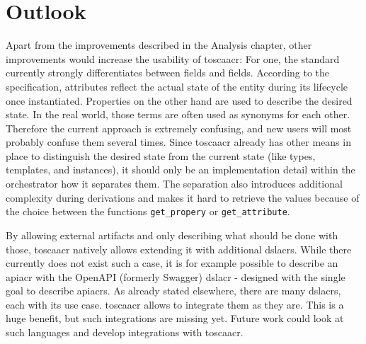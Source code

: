 \chapter{Outlook}




Apart from the  improvements described in the Analysis chapter, other improvements would increase the usability of \gls{toscaacr}: For one, the standard currently strongly differentiates between  fields and  fields. According to the specification, attributes reflect the actual state of the entity during its lifecycle once instantiated. Properties on the other hand are used to describe the desired state. In the real world, those terms are often used as synonyms for each other. Therefore the current approach is extremely confusing, and new users will most probably confuse them several times. Since \gls{toscaacr} already has other means in place to distinguish the desired state from the current state (like types, templates, and instances), it should only be an implementation detail within the orchestrator how it separates them. The separation also introduces additional complexity during derivations and makes it hard to retrieve the values because of the choice between the functions \texttt{get_propery} or \texttt{get_attribute}.

By allowing external artifacts and only describing what should be done with those, \gls{toscaacr} natively allows extending it with additional \gls{dslacr}s. While there currently does not exist such a case, it is for example possible to describe an \gls{apiacr} with the OpenAPI (formerly Swagger) \gls{dslacr} - designed with the single goal to describe \gls{apiacr}s. As already stated elsewhere, there are many \gls{dslacr}s, each with its use case. \Gls{toscaacr} allows to integrate them as they are. This is a huge benefit, but such integrations are missing yet. Future work could look at such languages and develop integrations with \gls{toscaacr}.

